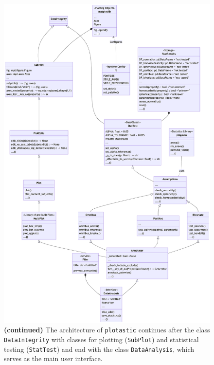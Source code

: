 \setcounter{figure}{0} %
\def\mycap{\textbf{(continued)} The architecture of \texttt{plotastic}
    continues after the class \texttt{DataIntegrity} with classes for plotting
    (\texttt{SubPlot}) and statistical testing (\texttt{StatTest}) and end with
    the class \texttt{DataAnalysis}, which serves as the main user interface.
    \umlconvention }
\begin{figure}[H]
    \centering
    \includegraphics[scale=.20]{APPENDIX_CHAPTER2/classdiagr_plot+stats.png}
    \caption{\mycap}
\end{figure}


\def\mytitle{Readme}
